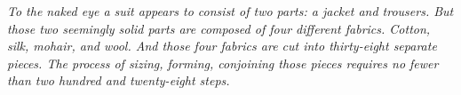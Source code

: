 \cleardoublepage
\thispagestyle{empty}
\afterpage{\blankpage}

\vspace*{\fill}
\begin{adjustwidth}{1in}{1in}
  \textit{To the naked eye a suit appears to consist of two parts: a jacket and
  trousers. But those two seemingly solid parts are composed of four different
  fabrics. Cotton, silk, mohair, and wool. And those four fabrics are cut into
  thirty-eight separate pieces. The process of sizing, forming, conjoining
  those pieces requires no fewer than two hundred and twenty-eight steps.}
\end{adjustwidth}
\vspace*{\fill}

\restoregeometry
\doublespace
